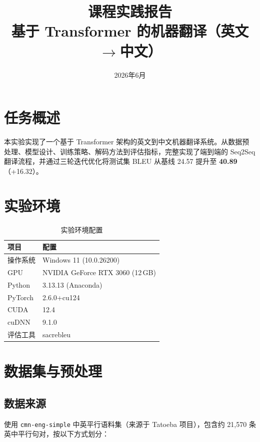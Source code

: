 \documentclass[12pt, a4paper]{ctexart}
\title{
  \vspace{-1cm}
  {\LARGE\bfseries 课程实践报告} \\[0.5em]
  {\Large 基于 Transformer 的机器翻译（英文$\to$中文）}
}
\author{}
\date{2026年6月}
\begin{document}
\maketitle
\thispagestyle{fancy}

\tableofcontents
\newpage

\section{任务概述}

本实验实现了一个基于 Transformer 架构的英文到中文机器翻译系统。从数据预处理、模型设计、训练策略、解码方法到评估指标，完整实现了端到端的 Seq2Seq 翻译流程，并通过三轮迭代优化将测试集 BLEU 从基线 24.57 提升至 \textbf{40.89}（+16.32）。

\section{实验环境}

\begin{table}[H]
\centering
\caption{实验环境配置}
\begin{tabular}{ll}
\toprule
\textbf{项目} & \textbf{配置} \\
\midrule
操作系统    & Windows 11 (10.0.26200) \\
GPU         & NVIDIA GeForce RTX 3060 (12\,GB) \\
Python      & 3.13.13 (Anaconda) \\
PyTorch     & 2.6.0+cu124 \\
CUDA        & 12.4 \\
cuDNN       & 9.1.0 \\
评估工具    & sacrebleu \\
\bottomrule
\end{tabular}
\end{table}

\section{数据集与预处理}

\subsection{数据来源}

使用 \texttt{cmn-eng-simple} 中英平行语料集（来源于 Tatoeba 项目），包含约 21,570 条英中平行句对，按以下方式划分：
\end{document}
